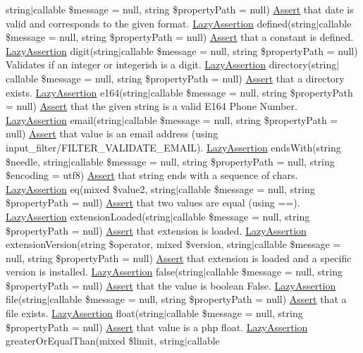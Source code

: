 string$\vert$callable \$message = null, string \$property\+Path = null) \mbox{\hyperlink{class_assert_1_1_assert}{Assert}} that date is valid and corresponds to the given format.  \mbox{\hyperlink{class_assert_1_1_lazy_assertion}{Lazy\+Assertion}} defined(string$\vert$callable \$message = null, string \$property\+Path = null) \mbox{\hyperlink{class_assert_1_1_assert}{Assert}} that a constant is defined.  \mbox{\hyperlink{class_assert_1_1_lazy_assertion}{Lazy\+Assertion}} digit(string$\vert$callable \$message = null, string \$property\+Path = null) Validates if an integer or integerish is a digit.  \mbox{\hyperlink{class_assert_1_1_lazy_assertion}{Lazy\+Assertion}} directory(string$\vert$callable \$message = null, string \$property\+Path = null) \mbox{\hyperlink{class_assert_1_1_assert}{Assert}} that a directory exists.  \mbox{\hyperlink{class_assert_1_1_lazy_assertion}{Lazy\+Assertion}} e164(string$\vert$callable \$message = null, string \$property\+Path = null) \mbox{\hyperlink{class_assert_1_1_assert}{Assert}} that the given string is a valid E164 Phone Number.  \mbox{\hyperlink{class_assert_1_1_lazy_assertion}{Lazy\+Assertion}} email(string$\vert$callable \$message = null, string \$property\+Path = null) \mbox{\hyperlink{class_assert_1_1_assert}{Assert}} that value is an email address (using input\+\_\+filter/\+F\+I\+L\+T\+E\+R\+\_\+\+V\+A\+L\+I\+D\+A\+T\+E\+\_\+\+E\+M\+A\+IL).  \mbox{\hyperlink{class_assert_1_1_lazy_assertion}{Lazy\+Assertion}} ends\+With(string \$needle, string$\vert$callable \$message = null, string \$property\+Path = null, string \$encoding = \textquotesingle{}utf8\textquotesingle{}) \mbox{\hyperlink{class_assert_1_1_assert}{Assert}} that string ends with a sequence of chars.  \mbox{\hyperlink{class_assert_1_1_lazy_assertion}{Lazy\+Assertion}} eq(mixed \$value2, string$\vert$callable \$message = null, string \$property\+Path = null) \mbox{\hyperlink{class_assert_1_1_assert}{Assert}} that two values are equal (using ==).  \mbox{\hyperlink{class_assert_1_1_lazy_assertion}{Lazy\+Assertion}} extension\+Loaded(string$\vert$callable \$message = null, string \$property\+Path = null) \mbox{\hyperlink{class_assert_1_1_assert}{Assert}} that extension is loaded.  \mbox{\hyperlink{class_assert_1_1_lazy_assertion}{Lazy\+Assertion}} extension\+Version(string \$operator, mixed \$version, string$\vert$callable \$message = null, string \$property\+Path = null) \mbox{\hyperlink{class_assert_1_1_assert}{Assert}} that extension is loaded and a specific version is installed.  \mbox{\hyperlink{class_assert_1_1_lazy_assertion}{Lazy\+Assertion}} false(string$\vert$callable \$message = null, string \$property\+Path = null) \mbox{\hyperlink{class_assert_1_1_assert}{Assert}} that the value is boolean False.  \mbox{\hyperlink{class_assert_1_1_lazy_assertion}{Lazy\+Assertion}} file(string$\vert$callable \$message = null, string \$property\+Path = null) \mbox{\hyperlink{class_assert_1_1_assert}{Assert}} that a file exists.  \mbox{\hyperlink{class_assert_1_1_lazy_assertion}{Lazy\+Assertion}} float(string$\vert$callable \$message = null, string \$property\+Path = null) \mbox{\hyperlink{class_assert_1_1_assert}{Assert}} that value is a php float.  \mbox{\hyperlink{class_assert_1_1_lazy_assertion}{Lazy\+Assertion}} greater\+Or\+Equal\+Than(mixed \$limit, string$\vert$callable 